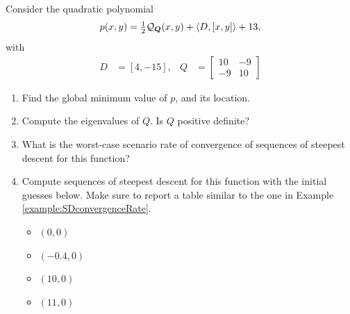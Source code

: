 \begin{problem}\cite[lec5\_steep\_desce, 8.3]{Freund2004nonlinear}
Consider the quadratic polynomial 
\begin{equation*}
p(x,y) = \tfrac{1}{2} \mathcal{Q}_{\boldsymbol{Q}}(x,y) + \langle D, [x,y] \rangle + 13,
\end{equation*}
with
\begin{align*}
D &= [4, -15], & Q &= \begin{bmatrix} 10 & -9 \\ -9 & 10 \end{bmatrix}
\end{align*}
\begin{enumerate}
	\item Find the global minimum value of $p$, and its location.
	\item Compute the eigenvalues of $Q$.  Is $Q$ positive definite?
	\item What is the worst-case scenario rate of convergence of sequences of steepest descent for this function?
	\item Compute sequences of steepest descent for this function with the initial guesses below.  Make sure to report a table similar to the one in Example \ref{example:SDconvergenceRate}.
	\begin{itemize}
		\item $(0,0)$
		\item $(-0.4, 0)$
		\item $(10,0)$
		\item $(11, 0)$
	\end{itemize}
\end{enumerate}
\end{problem}

